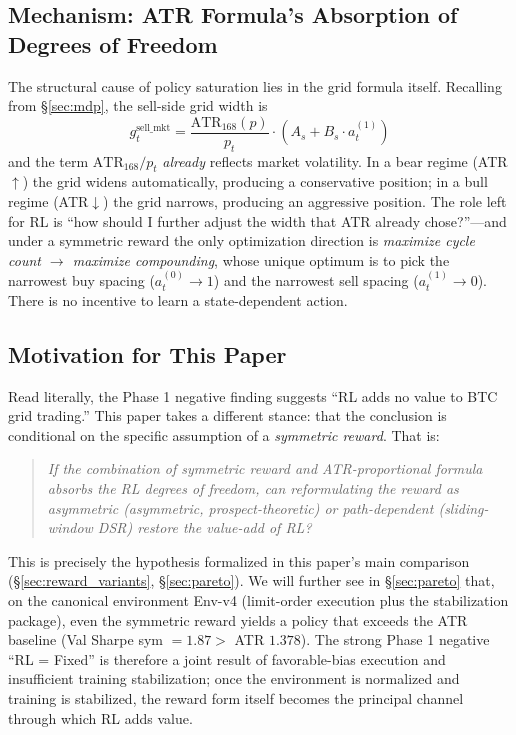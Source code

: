 \documentclass[11pt, a4paper]{article}
\begin{document}
\subsection{Mechanism: ATR Formula's Absorption of Degrees of Freedom}
\label{sec:phase1_mechanism}

The structural cause of policy saturation lies in the grid formula itself.
Recalling from \S\ref{sec:mdp}, the sell-side grid width is
\begin{equation}
g^{\mathrm{sell\_mkt}}_t = \frac{\mathrm{ATR}_{168}(p)}{p_t}
\cdot (A_s + B_s \cdot a_t^{(1)})
\end{equation}
and the term $\mathrm{ATR}_{168}/p_t$ \emph{already} reflects market
volatility. In a bear regime (ATR$\uparrow$) the grid widens automatically,
producing a conservative position; in a bull regime (ATR$\downarrow$) the grid
narrows, producing an aggressive position. The role left for RL is
``how should I further adjust the width that ATR already chose?''---and under
a symmetric reward the only optimization direction is \emph{maximize cycle
count $\to$ maximize compounding}, whose unique optimum is to pick the
narrowest buy spacing ($a_t^{(0)} \to 1$) and the narrowest sell spacing
($a_t^{(1)} \to 0$). There is no incentive to learn a state-dependent action.

\subsection{Motivation for This Paper}
\label{sec:phase1_implication}

Read literally, the Phase 1 negative finding suggests ``RL adds no value to
BTC grid trading.'' This paper takes a different stance: that the conclusion
is conditional on the specific assumption of a \emph{symmetric reward}. That
is:

\begin{quote}
\emph{If the combination of symmetric reward and ATR-proportional formula
absorbs the RL degrees of freedom, can reformulating the reward as
\emph{asymmetric} (asymmetric, prospect-theoretic) or \emph{path-dependent}
(sliding-window DSR) restore the value-add of RL?}
\end{quote}

This is precisely the hypothesis formalized in this paper's main comparison
(\S\ref{sec:reward_variants}, \S\ref{sec:pareto}). We will further see in
\S\ref{sec:pareto} that, on the canonical environment Env-v4 (limit-order
execution plus the stabilization package), even the symmetric reward yields a
policy that exceeds the ATR baseline (Val Sharpe sym $= 1.87 > $ ATR $1.378$).
The strong Phase 1 negative ``RL = Fixed'' is therefore a joint result of
favorable-bias execution and insufficient training stabilization; once the
environment is normalized and training is stabilized, the reward form itself
becomes the principal channel through which RL adds value.
\end{document}
